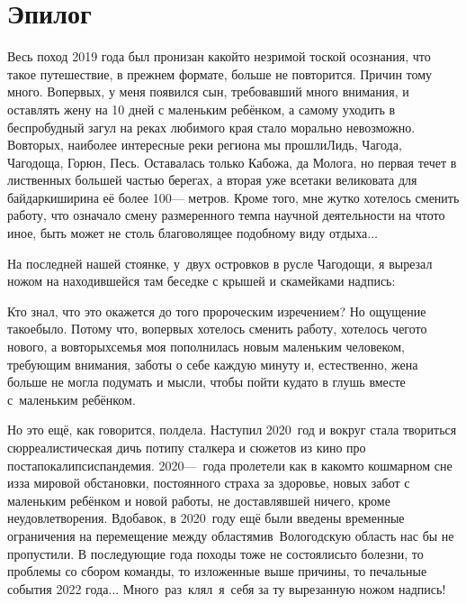 {
\cleardoublepage
{}

\fancyhead[LE]{\fancyplain{}{}}
\fancyhead[RO]{\fancyplain{}{}}

\section*{Эпилог}
Весь поход 2019 года был пронизан какой\sdash то незримой тоской осознания, что такое путешествие, в прежнем формате, больше не повторится. Причин тому много. Во\sdash первых, у меня появился сын, требовавший много внимания, и оставлять жену на 10 дней с маленьким ребёнком, а самому уходить в беспробудный загул на реках любимого края стало морально невозможно. Во\sdash вторых, наиболее интересные реки региона мы прошли\mdash Лидь, Чагода, Чагодоща, Горюн, Песь. Оставалась только Кабожа, да Молога, но первая течет в лиственных большей частью берегах, а вторая уже все\sdash таки великовата для байдарки\mdash ширина её более 100\thinspace\nobreakdash--- метров. Кроме того, мне жутко хотелось сменить работу, что означало смену размеренного темпа научной деятельности на что\sdash то иное, быть может не столь благоволящее подобному виду отдыха$\ldots$ 

На последней нашей стоянке, у~двух островков в русле Чагодощи, я вырезал ножом на находившейся там беседке с крышей и скамейками надпись:

{\centering\Large{}}

Кто знал, что это окажется до того пророческим изречением? Но ощущение такое\mdash было. Потому что, во\sdash первых хотелось сменить работу, хотелось чего\sdash то нового, а во\sdash вторых\mdash семья моя пополнилась новым маленьким человеком, требующим внимания, заботы о себе каждую минуту и, естественно, жена больше не могла подумать и мысли, чтобы пойти куда\sdash то в глушь вместе с~маленьким ребёнком.

Но это ещё, как говорится, полдела. Наступил 2020~год и вокруг стала твориться сюрреалистическая дичь потипу сталкера и сюжетов из кино про постапокалипсис\mdash пандемия. 2020\thinspace\nobreakdash---~года пролетели как в каком\sdash то кошмарном сне из\sdash за мировой обстановки, постоянного страха за здоровье, новых забот с маленьким ребёнком и новой работы, не доставлявшей ничего, кроме неудовлетворения. Вдобавок, в 2020~году ещё были введены временные ограничения на перемещение между областями\mdash в~Вологодскую область нас бы не пропустили. В последующие года походы тоже не состоялись\mdash то болезни, то проблемы со сбором команды, то изложенные выше причины, то печальные события 2022 года$\ldots$ Много~раз~клял~я~себя за ту вырезанную ножом надпись!

}
